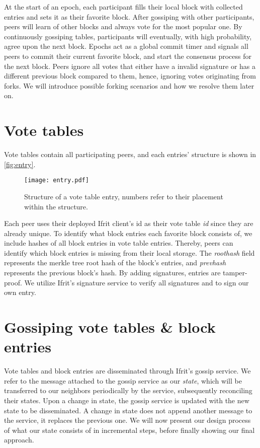 \documentclass[USenglish]{uit-thesis}
\begin{document}
At the start of an epoch, each participant fills their local block with collected entries and sets it as their favorite block.
After gossiping with other participants, peers will learn of other blocks and always vote for the most popular one.
By continuously gossiping tables, participants will eventually, with high probability, agree upon the next block.
Epochs act as a global commit timer and signals all peers to commit their current favorite block, and start the consensus process for the next block.
Peers ignore all votes that either have a invalid signature or has a different previous block compared to them, hence, ignoring votes originating from forks.
We will introduce possible forking scenarios and how we resolve them later on.



\section{Vote tables}
Vote tables contain all participating peers, and each entries' structure is shown in \autoref{fig:entry}.
\begin{figure}[h]
	\centering
	\texttt{[image: entry.pdf]}
	\caption[Vote table entry structure.]{Structure of a vote table entry, numbers refer to their placement within the structure.}
	\label{fig:entry}
\end{figure}
Each peer uses their deployed Ifrit client's id as their vote table \textit{id} since they are already unique.
To identify what block entries each favorite block consists of, we include hashes of all block entries in vote table entries.
Thereby, peers can identify which block entries is missing from their local storage.
The \textit{roothash} field represents the merkle tree root hash of the block's entries, and \textit{prevhash} represents the previous block's hash.
By adding signatures, entries are tamper-proof.
We utilize Ifrit's signature service to verify all signatures and to sign our own entry.

\section{Gossiping vote tables \& block entries}
Vote tables and block entries are disseminated through Ifrit's gossip service.
We refer to the message attached to the gossip service as our \textit{state}, which will be transferred to our neighbors periodically by the service, subsequently reconciling their states. 
Upon a change in state, the gossip service is updated with the new state to be disseminated.
A change in state does not append another message to the service, it replaces the previous one.
We will now present our design process of what our state consists of in incremental steps, before finally showing our final approach.
\end{document}
